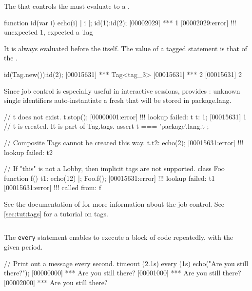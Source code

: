 The  that controls the  must evaluate to a
.

\begin{urbiscript}
function id(var i) { echo(i) | i }|;
id(1):id(2);
[00002029] *** 1
[00002029:error] !!! unexpected 1, expected a Tag
\end{urbiscript}

It is always evaluated before the  itself.  The value of a
tagged statement is that of the .
\begin{urbiscript}
id(Tag.new()):id(2);
[00015631] *** Tag<tag_3>
[00015631] *** 2
[00015631] 2
\end{urbiscript}

Since job control is especially useful in interactive sessions, \us provides
: unknown single identifiers auto-instantiate a fresh
 that will be stored in package.lang.

\begin{urbiscript}
// t does not exist.
t.stop();
[00000001:error] !!! lookup failed: t
t: 1;
[00015631] 1
// t is created.  It is part of Tag.tags.
assert
{
  t === 'package'.lang.t
};

// Composite Tags cannot be created this way.
t.t2: echo(2);
[00015631:error] !!! lookup failed: t2

// If "this" is not a Lobby, then implicit tags are not supported.
class Foo { function f() { t1: echo(12) } }|;
Foo.f();
[00015631:error] !!! lookup failed: t1
[00015631:error] !!!    called from: f
\end{urbiscript}


See the documentation of  for more information about the job
control.  See \autoref{sec:tut:tags} for a tutorial on tags.

\subsection{}
\label{sec:lang:every}
The \lstinline{every} statement enables to execute a block of code
repeatedly, with the given period.

\begin{urbiscript}
// Print out a message every second.
timeout (2.1s)
  every (1s)
    echo("Are you still there?");
[00000000] *** Are you still there?
[00001000] *** Are you still there?
[00002000] *** Are you still there?
\end{urbiscript}

